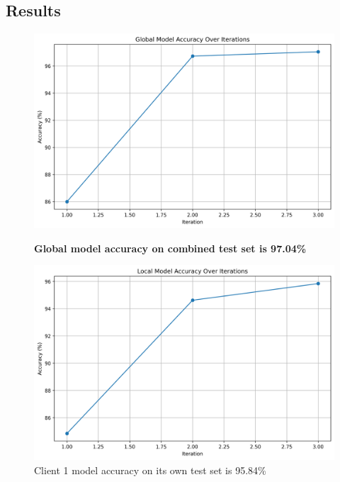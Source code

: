 \documentclass[10pt]{article}
\begin{document}
\subsection{Results}
\begin{figure}[H]
    \centering
    \begin{minipage}{0.49\textwidth}
        \centering
        \includegraphics[height=0.23\textheight]{img/global_model_accuracy.png}
        \caption{\textbf{Global model accuracy on combined test set is 97.04\%}}
        \label{fig:global_accuracy}
    \end{minipage}
    \hfill
    \begin{minipage}{0.49\textwidth}
        \centering
        \includegraphics[height=0.23\textheight]{img/local_model_accuracy.png}
        \caption{Client 1 model accuracy on its own test set is 95.84\%}
        \label{fig:local_accuracy}
    \end{minipage}
\end{figure}
\end{document}
